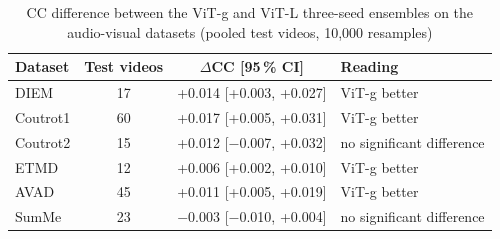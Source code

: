 \begin{table}[htbp]
  \centering
  \caption{\acrshort{CC} difference between the \acrshort{ViT}-g and \acrshort{ViT}-L three-seed ensembles on
  the audio-visual datasets (pooled test videos, 10,000 resamples)}\label{tab:app-av-boot}
  \small
  \begin{tabular}{@{}lccl@{}}
    \toprule
    \textbf{Dataset} & \textbf{Test videos} & $\Delta$\textbf{\acrshort{CC}} [95\,\% \acrshort{CI}] & \textbf{Reading} \\
    \midrule
    DIEM     & 17 & +0.014 [+0.003, +0.027] & \acrshort{ViT}-g better \\
    Coutrot1 & 60 & +0.017 [+0.005, +0.031] & \acrshort{ViT}-g better \\
    Coutrot2 & 15 & +0.012 [$-$0.007, +0.032] & no significant difference \\
    ETMD     & 12 & +0.006 [+0.002, +0.010] & \acrshort{ViT}-g better \\
    AVAD     & 45 & +0.011 [+0.005, +0.019] & \acrshort{ViT}-g better \\
    SumMe    & 23 & $-$0.003 [$-$0.010, +0.004] & no significant difference \\
    \bottomrule
  \end{tabular}
\end{table}
